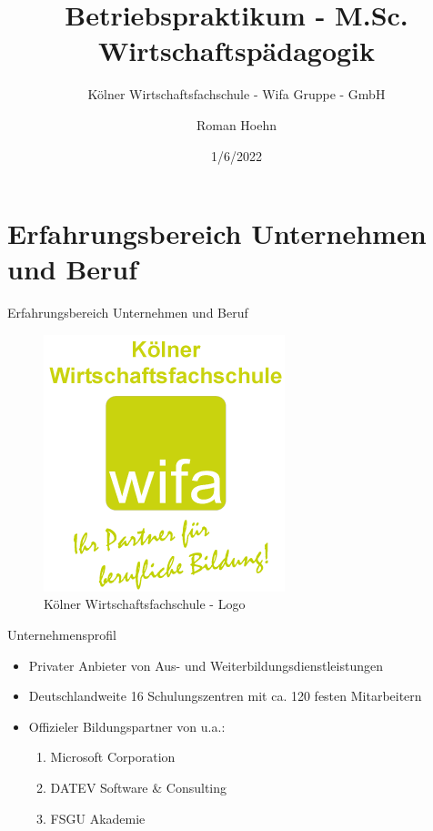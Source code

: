 \documentclass[
  10pt,
  ignorenonframetext,
]{beamer}
\title{Betriebspraktikum - M.Sc. Wirtschaftspädagogik}
\subtitle{Kölner Wirtschaftsfachschule - Wifa Gruppe - GmbH}
\author{Roman Hoehn}
\date{1/6/2022}
\providecommand{\tightlist}{%
  \setlength{\itemsep}{0pt}\setlength{\parskip}{0pt}}
\begin{document}
\frame{\titlepage}

\begin{frame}[allowframebreaks]
  \tableofcontents[hideallsubsections]
\end{frame}
\hypertarget{erfahrungsbereich-unternehmen-und-beruf}{%
\section{Erfahrungsbereich Unternehmen und
Beruf}\label{erfahrungsbereich-unternehmen-und-beruf}}

\begin{frame}{Erfahrungsbereich Unternehmen und Beruf}
\begin{figure}
\centering
\includegraphics{pics/wifa_logo.png}
\caption{Kölner Wirtschaftsfachschule - Logo}
\end{figure}
\end{frame}

\begin{frame}{Unternehmensprofil}
\protect\hypertarget{unternehmensprofil}{}
\begin{itemize}
\tightlist
\item
  Privater Anbieter von Aus- und Weiterbildungsdienstleistungen
\item
  Deutschlandweite 16 Schulungszentren mit ca. 120 festen Mitarbeitern
\item
  Offizieler Bildungspartner von u.a.:

  \begin{enumerate}
  \tightlist
  \item
    Microsoft Corporation
  \item
    DATEV Software \& Consulting
  \item
    FSGU Akademie
  \end{enumerate}
\end{itemize}
\end{frame}
\end{document}
